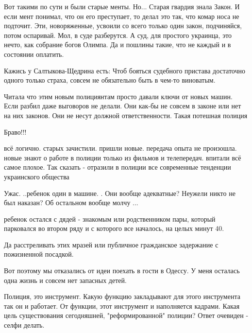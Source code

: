 \begin{itemize}
\begin{itemize}

Вот такими по сути и были старые менты. Но... Старая гвардия знала Закон. И
если мент понимал, что он его преступает, то делал это так, что комар носа не
подточит. Эти, новоряженные, усвоили со всего только один закон, подчиняйся,
потом оспаривай. Мол, в суде разберутся. А суд, для простого украинца, это
нечто, как собрание богов Олимпа. Да и пошлины такие, что не каждый и в
состоянии оплатить.

\end{itemize} %


Кажись у Салтыкова-Щедрина есть: Чтоб бояться судебного пристава достаточно
одного только страха, совсем не обязательно быть в чем-то виноватым.


Читала что этим новым полициянтам просто давали ключи от новых машин. Если
разбил даже выговоров не делали. Они как-бы не совсем в законе или нет на них
законов. Они не несут должной ответственности. Такая потешная полиция

Браво!!!


всё логично. старых зачистили. пришли новые. передача опыта не произошла. новые
знают о работе в полиции только из фильмов и телепередач. впитали всё самое
плохое. Так сказать - отразили в полиции все современные тенденции украинского
общества

Ужас. ..ребенок один в машине. . Они вообще адекватные? Неужели никто не был наказан? Об остальном вообще молчу ...

\begin{itemize} %
ребенок остался с дядей - знакомым или родственником пары, который парковался во втором ряду и с которого все началось, на целых минут 40.
\end{itemize} %

Да расстреливать этих мразей или публичное гражданское задержание с пожизненной посадкой.

Вот поэтому мы отказались от идеи поехать в гости в Одессу. У меня осталась одна жизнь и совсем нет запасных детей.


Полиция, это инструмент. Какую функцию закладывают для этого инструмента так он
и работает. От функции, этот инструмент и наполняется кадрами. Какая цель
существования сегодняшней, "реформированной" полиции? Ответ очевиден - селфи
делать.


\end{itemize}
